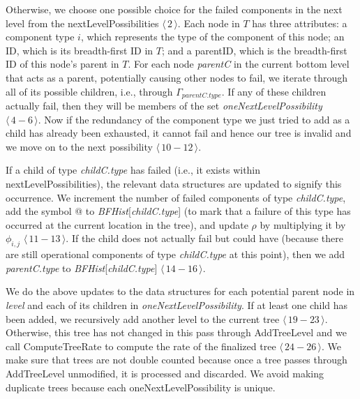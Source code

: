 \documentclass[12pt]{article}
\newcommand{\varName}[1]{\textrm{\it#1}}
\newcommand{\citeLine}[1]{$\langle \, #1 \, \rangle$}
\newcommand{\citeBlock}[2]{$\langle \, #1 - #2 \, \rangle$}
\begin{document}
Otherwise, we choose one possible choice for the failed components in the next level from the nextLevelPossibilities \citeLine{2}. Each node in $T$ has three attributes: a component type $i$, which represents the type of the component of this node; an ID, which is its breadth-first ID in $T$; and a parentID, which is the breadth-first ID of this node's parent in $T$. For each node \varName{parentC} in the current bottom level that acts as a parent, potentially causing other nodes to fail, we iterate through all of its possible children, i.e., through $\Gamma_{parentC.type}$. If any of these children actually fail, then they will be members of the set \varName{oneNextLevelPossibility} \citeBlock{4}{6}. Now if the redundancy of the component type we just tried to add as a child has already been exhausted, it cannot fail and hence our tree is invalid and we move on to the next possibility \citeBlock{10}{12}.

If a child of type \varName{childC.type} has failed (i.e., it exists within nextLevelPossibilities), the relevant data structures are updated to signify this occurrence. We increment the number of failed components of type \varName{childC.type}, add the symbol @ to \varName{BFHist}[\varName{childC.type}] (to mark that a failure of this type has occurred at the current location in the tree), and update $\rho$ by multiplying it by $\phi_{i, j}$ \citeBlock{11}{13}. If the child does not actually fail but could have (because there are still operational components of type \varName{childC.type} at this point), then we add \varName{parentC.type} to \varName{BFHist}[\varName{childC.type}] \citeBlock{14}{16}.

We do the above updates to the data structures for each potential parent node in \varName{level} and each of its children in \varName{oneNextLevelPossibility}. If at least one child has been added, we recursively add another level to the current tree \citeBlock{19}{23}. Otherwise, this tree has not changed in this pass through \mbox{AddTreeLevel} and we call ComputeTreeRate to compute the rate of the finalized tree \citeBlock{24}{26}. We make sure that trees are not double counted because once a tree passes through \mbox{AddTreeLevel} unmodified, it is processed and discarded. We avoid making duplicate trees because each oneNextLevelPossibility is unique.
\end{document}

